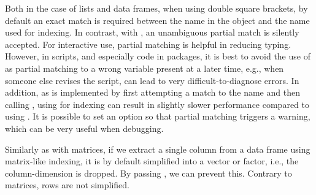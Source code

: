 \documentclass[krantz2]{krantz}\usepackage{knitr}
\begin{document}
\begin{warningbox}
Both in the case of lists and data frames, when using double square brackets, by default an exact match is required between the name in the object and the name used for indexing. In contrast, with \Roperator{\$}, an unambiguous partial match is silently accepted. For interactive use, partial matching is helpful in reducing typing. However, in scripts, and especially \Rlang code in packages, it is best to avoid the use of \Roperator{\$} as partial matching to a wrong variable present at a later time, e.g., when someone else revises the script, can lead to very difficult-to-diagnose errors. In addition, as \Roperator{\$} is implemented by first attempting a match to the name and then calling \Roperator{[[ ]]}, using \Roperator{\$} for indexing can result in slightly slower performance compared to using \Roperator{[[ ]]}. It is possible to set an \Rlang option so that partial matching triggers a warning, which can be very useful when debugging.
\end{warningbox}

Similarly as with matrices, if we extract a single column from a data frame using matrix-like indexing, it is by default simplified into a vector or factor, i.e., the column-dimension is dropped. By passing , we can prevent this. Contrary to matrices, rows are not simplified.
\end{document}
